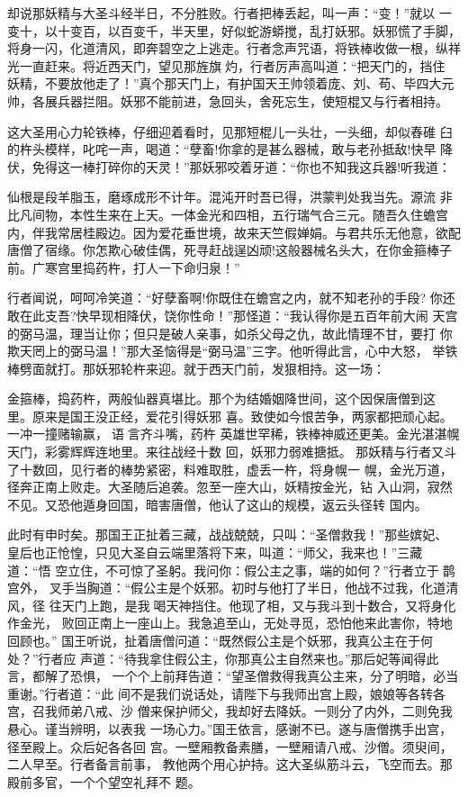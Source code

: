 却说那妖精与大圣斗经半日，不分胜败。行者把棒丢起，叫一声：“变！”就以
一变十，以十变百，以百变千，半天里，好似蛇游蟒搅，乱打妖邪。妖邪慌了手脚，
将身一闪，化道清风，即奔碧空之上逃走。行者念声咒语，将铁棒收做一根，纵祥
光一直赶来。将近西天门，望见那旌旗灼，行者厉声高叫道：“把天门的，挡住
妖精，不要放他走了！”真个那天门上，有护国天王帅领着庞、刘、苟、毕四大元
帅，各展兵器拦阻。妖邪不能前进，急回头，舍死忘生，使短棍又与行者相持。

这大圣用心力轮铁棒，仔细迎着看时，见那短棍儿一头壮，一头细，却似舂碓
臼的杵头模样，叱咤一声，喝道：“孽畜!你拿的是甚么器械，敢与老孙抵敌!快早
降伏，免得这一棒打碎你的天灵！”那妖邪咬着牙道：“你也不知我这兵器!听我道：

仙根是段羊脂玉，磨琢成形不计年。混沌开时吾已得，洪蒙判处我当先。源流
非比凡间物，本性生来在上天。一体金光和四相，五行瑞气合三元。随吾久住蟾宫
内，伴我常居桂殿边。因为爱花垂世境，故来天竺假婵娟。与君共乐无他意，欲配
唐僧了宿缘。你怎欺心破佳偶，死寻赶战逞凶顽!这般器械名头大，在你金箍棒子
前。广寒宫里捣药杵，打人一下命归泉！”

行者闻说，呵呵冷笑道：“好孽畜啊!你既住在蟾宫之内，就不知老孙的手段?
你还敢在此支吾?快早现相降伏，饶你性命！”那怪道：“我认得你是五百年前大闹
天宫的弼马温，理当让你；但只是破人亲事，如杀父母之仇，故此情理不甘，要打
你欺天罔上的弼马温！”那大圣恼得是“弼马温”三字。他听得此言，心中大怒，
举铁棒劈面就打。那妖邪轮杵来迎。就于西天门前，发狠相持。这一场：

金箍棒，捣药杵，两般仙器真堪比。那个为结婚姻降世间，这个因保唐僧到这
里。原来是国王没正经，爱花引得妖邪
喜。致使如今恨苦争，两家都把顽心起。一冲一撞赌输赢，语言齐斗嘴，药杵
英雄世罕稀，铁棒神威还更美。金光湛湛幌天门，彩雾辉辉连地里。来往战经十数
回，妖邪力弱难搪抵。
那妖精与行者又斗了十数回，见行者的棒势紧密，料难取胜，虚丢一杵，将身幌一
幌，金光万道，径奔正南上败走。大圣随后追袭。忽至一座大山，妖精按金光，钻
入山洞，寂然不见。又恐他遁身回国，暗害唐僧，他认了这山的规模，返云头径转
国内。

此时有申时矣。那国王正扯着三藏，战战兢兢，只叫：“圣僧救我！”那些嫔妃、
皇后也正怆惶，只见大圣自云端里落将下来，叫道：“师父，我来也！”三藏道：“悟
空立住，不可惊了圣躬。我问你：假公主之事，端的如何？”行者立于鹊宫外，
叉手当胸道：“假公主是个妖邪。初时与他打了半日，他战不过我，化道清风，径
往天门上跑，是我喝天神挡住。他现了相，又与我斗到十数合，又将身化作金光，
败回正南上一座山上。我急追至山，无处寻觅，恐怕他来此害你，特地回顾也。”
国王听说，扯着唐僧问道：“既然假公主是个妖邪，我真公主在于何处？”行者应
声道：“待我拿住假公主，你那真公主自然来也。”那后妃等闻得此言，都解了恐惧，
一个个上前拜告道：“望圣僧救得我真公主来，分了明暗，必当重谢。”行者道：“此
间不是我们说话处，请陛下与我师出宫上殿，娘娘等各转各宫，召我师弟八戒、沙
僧来保护师父，我却好去降妖。一则分了内外，二则免我悬心。谨当辨明，以表我
一场心力。”国王依言，感谢不已。遂与唐僧携手出宫，径至殿上。众后妃各各回
宫。一壁厢教备素膳，一壁厢请八戒、沙僧。须臾间，二人早至。行者备言前事，
教他两个用心护持。这大圣纵筋斗云，飞空而去。那殿前多官，一个个望空礼拜不
题。

